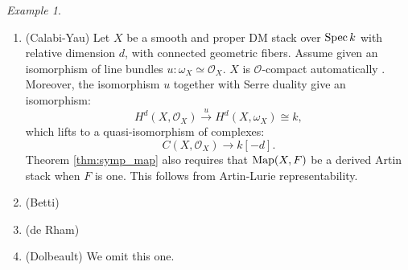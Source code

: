 \documentclass[10pt,a4paper,reqno,oneside]{book} %
\theoremstyle{plain}
\theoremstyle{definition}
\theoremstyle{remark}
\newtheorem{eg}[thm]{Example}
\numberwithin{equation}{section}
\begin{document}
\begin{eg}
\begin{enumerate}
\item (Calabi-Yau) Let $X$ be a smooth and proper DM stack over $\operatorname{Spec} k$ with relative dimension $d$, with connected
geometric fibers. Assume given an isomorphism of line bundles $u:\omega_X \simeq \mathcal{O}_X$. $X$ is $\mathcal{O}$-compact
automatically . Moreover, the isomorphism $u$ together with Serre duality give an isomorphism:
\[	H^d(X,\mathcal{O}_X) \overset{u}{\to} H^d(X,\omega_X) \cong k ,	\]
which lifts to a quasi-isomorphism of complexes:
\[	C(X,\mathcal{O}_X) \to k[-d] .	\]
Theorem \ref{thm:symp_map} also requires that $\operatorname{Map}(X,F)$ be a derived Artin stack when $F$ is one. This follows from 
Artin-Lurie representability.
\item (Betti) 
\item (de Rham)
\item (Dolbeault) We omit this one.
\end{enumerate}
\end{eg}
\end{document}
